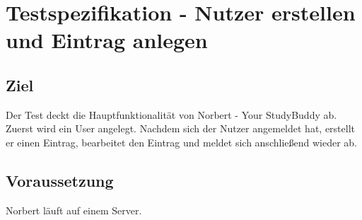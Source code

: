 
\chapter{Testspezifikation - Nutzer erstellen und Eintrag anlegen}
\section{Ziel}
Der Test deckt die Hauptfunktionalität von Norbert - Your StudyBuddy ab. Zuerst wird ein User angelegt. Nachdem sich der Nutzer angemeldet hat, erstellt er einen Eintrag, bearbeitet den Eintrag und meldet sich anschließend wieder ab.


\section{Voraussetzung}
Norbert läuft auf einem Server. 

